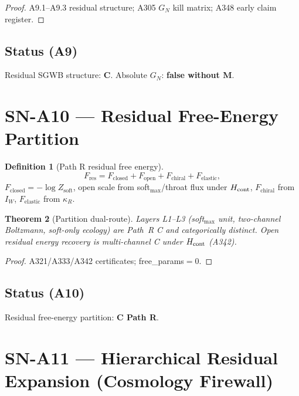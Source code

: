 \documentclass[11pt,a4paper]{article}
\newtheorem{theorem}{Theorem}[section]
\theoremstyle{definition}
\newtheorem{definition}[theorem]{Definition}
\begin{document}
\begin{proof}
A9.1--A9.3 residual structure; A305 $G_N$ kill matrix; A348 early claim register.
\end{proof}

\subsection*{Status (A9)} Residual SGWB structure: \textbf{C}. Absolute $G_N$: \textbf{false without M}.

\section{SN-A10 --- Residual Free-Energy Partition}
\label{sec:SNA10}

\begin{definition}[Path R residual free energy]
\label{def:A10}
\begin{equation}
F_{\mathrm{res}}=F_{\mathrm{closed}}+F_{\mathrm{open}}+F_{\mathrm{chiral}}+F_{\mathrm{elastic}},
\end{equation}
$F_{\mathrm{closed}}=-\log Z_{\mathrm{soft}}$, open scale from soft$_{\max}$/throat flux under $H_{\rm cont}$,
$F_{\mathrm{chiral}}$ from $I_W$, $F_{\mathrm{elastic}}$ from $\kappa_R$.
\end{definition}

\begin{theorem}[Partition dual-route]
\label{thm:A10}
Layers L1--L3 (soft$_{\max}$ unit, two-channel Boltzmann, soft-only ecology) are Path~R C and categorically distinct.
Open residual energy recovery is multi-channel C under $H_{\rm cont}$ (A342).
\end{theorem}

\begin{proof}
A321/A333/A342 certificates; free\_params${=}0$.
\end{proof}

\subsection*{Status (A10)} Residual free-energy partition: \textbf{C Path R}.

\section{SN-A11 --- Hierarchical Residual Expansion (Cosmology Firewall)}
\label{sec:SNA11}
\end{document}
